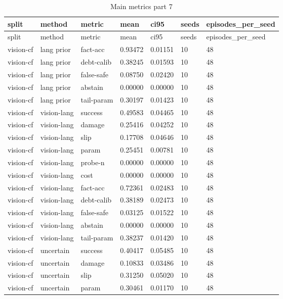 \documentclass{article}
\begin{document}
\begin{center}
\tiny
\renewcommand{\arraystretch}{0.92}
\setlength{\tabcolsep}{3pt}
\begin{longtable}{lllllll}
\caption{Main metrics part 7}\label{tab:main-metrics-7}\\
\toprule
split & method & metric & mean & ci95 & seeds & episodes\_per\_seed \\
\midrule
\endfirsthead
\toprule
split & method & metric & mean & ci95 & seeds & episodes\_per\_seed \\
\midrule
\endhead
vision-cf & lang prior & fact-acc & 0.93472 & 0.01151 & 10 & 48 \\
vision-cf & lang prior & debt-calib & 0.38245 & 0.01593 & 10 & 48 \\
vision-cf & lang prior & false-safe & 0.08750 & 0.02420 & 10 & 48 \\
vision-cf & lang prior & abstain & 0.00000 & 0.00000 & 10 & 48 \\
vision-cf & lang prior & tail-param & 0.30197 & 0.01423 & 10 & 48 \\
vision-cf & vision-lang & success & 0.49583 & 0.04465 & 10 & 48 \\
vision-cf & vision-lang & damage & 0.25416 & 0.04252 & 10 & 48 \\
vision-cf & vision-lang & slip & 0.17708 & 0.04646 & 10 & 48 \\
vision-cf & vision-lang & param & 0.25451 & 0.00781 & 10 & 48 \\
vision-cf & vision-lang & probe-n & 0.00000 & 0.00000 & 10 & 48 \\
vision-cf & vision-lang & cost & 0.00000 & 0.00000 & 10 & 48 \\
vision-cf & vision-lang & fact-acc & 0.72361 & 0.02483 & 10 & 48 \\
vision-cf & vision-lang & debt-calib & 0.38189 & 0.02473 & 10 & 48 \\
vision-cf & vision-lang & false-safe & 0.03125 & 0.01522 & 10 & 48 \\
vision-cf & vision-lang & abstain & 0.00000 & 0.00000 & 10 & 48 \\
vision-cf & vision-lang & tail-param & 0.38237 & 0.01420 & 10 & 48 \\
vision-cf & uncertain & success & 0.40417 & 0.05485 & 10 & 48 \\
vision-cf & uncertain & damage & 0.10833 & 0.03486 & 10 & 48 \\
vision-cf & uncertain & slip & 0.31250 & 0.05020 & 10 & 48 \\
vision-cf & uncertain & param & 0.30461 & 0.01170 & 10 & 48 \\

\end{longtable}
\end{center}
\end{document}
